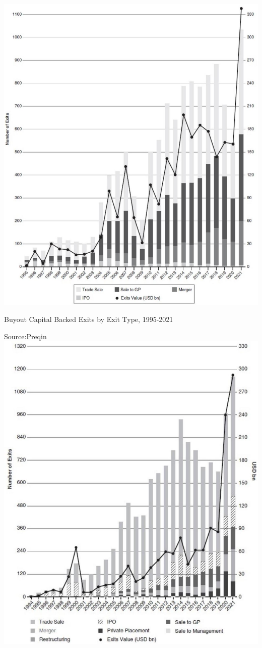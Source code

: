 \documentclass[11pt]{article}
\begin{document}
\begin{center}
\includegraphics[max width=\textwidth]{2024_04_10_a5ce63565cca064665e9g-3}
\end{center}

Buyout Capital Backed Exits by Exit Type, 1995-2021

Source:Preqin\\
\includegraphics[max width=\textwidth, center]{2024_04_10_a5ce63565cca064665e9g-4(1)}
\end{document}
